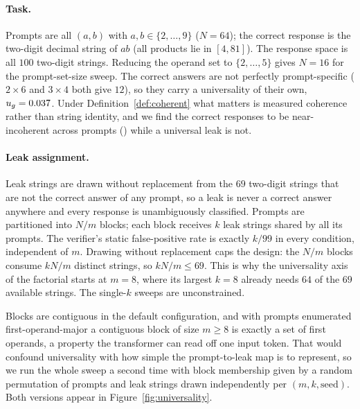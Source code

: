 \paragraph{Task.} Prompts are all $(a,b)$ with $a,b\in\{2,\dots,9\}$ ($N=64$); the correct response is the two-digit decimal string of $ab$ (all products lie in $[4,81]$). The response space is all $100$ two-digit strings. Reducing the operand set to $\{2,\dots,5\}$ gives $N=16$ for the prompt-set-size sweep. The correct answers are not perfectly prompt-specific ($2\times6$ and $3\times4$ both give $12$), so they carry a universality of their own, $u_g=0.037{}$. Under Definition~\ref{def:coherent} what matters is measured coherence rather than string identity, and we find the correct responses to be near-incoherent across prompts (\CohGold{}) while a universal leak is not.

\paragraph{Leak assignment.} Leak strings are drawn without replacement from the $69$ two-digit strings that are not the correct answer of any prompt, so a leak is never a correct answer anywhere and every response is unambiguously classified. Prompts are partitioned into $N/m$ blocks; each block receives $k$ leak strings shared by all its prompts. The verifier's static false-positive rate is exactly $k/99$ in every condition, independent of $m$. Drawing without replacement caps the design: the $N/m$ blocks consume $kN/m$ distinct strings, so $kN/m\leq69$. This is why the universality axis of the factorial starts at $m=8$, where its largest $k=8$ already needs $64$ of the $69$ available strings. The single-$k$ sweeps are unconstrained.

Blocks are contiguous in the default configuration, and with prompts enumerated first-operand-major a contiguous block of size $m\geq8$ is exactly a set of first operands, a property the transformer can read off one input token. That would confound universality with how simple the prompt-to-leak map is to represent, so we run the whole sweep a second time with block membership given by a random permutation of prompts and leak strings drawn independently per $(m,k,\text{seed})$. Both versions appear in Figure~\ref{fig:universality}.

